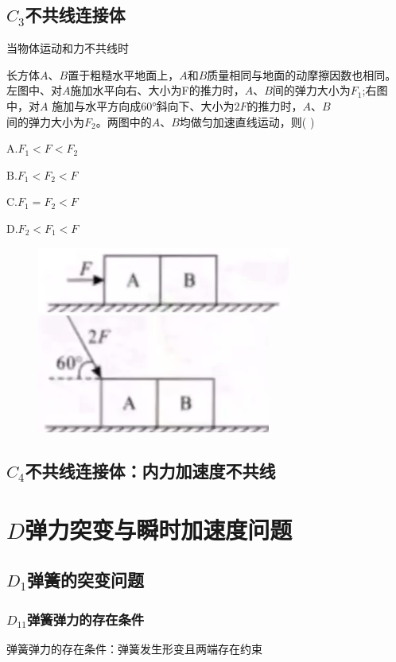 \documentclass[lang=cn,10pt]{elegantbook}
\begin{document}
       \subsection{$C_{3}$不共线连接体}
       当物体运动和力不共线时
       \vspace{3cm}
       \begin{example}
       	长方体$A$、$B$置于粗糙水平地面上，$A$和$B$质量相同与地面的动摩擦因数也相同。左图中、对$A$施加水平向右、大小为F的推力时，$A、B$间的弹力大小为$F_1$;右图中，对$A$ 施加与水平方向成60°斜向下、大小为$2F$的推力时，$A$、$B$ $\text{间的弹力大小为}F_2$。两图中的$A$、$B$均做匀加速直线运动，则( ) 
       	
       	$\mathrm{A.}F_{1}<F<F_{2}$
       	
       	$\mathrm{B.}F_{1}<F_{2}<F$
       	
       $	\mathrm{C.}F_{1}=F_{2}<F$
       	
       	$\mathrm{D.}F_{2}<F_{1}<F$
       	\begin{figure}[H]
       		\centering
       		\includegraphics[width=0.3\linewidth]{image/42}
       		\includegraphics[width=0.3\linewidth]{image/43}
       	\end{figure}
       	
       \end{example}
       \subsection{$C_{4}$不共线连接体：内力加速度不共线}
       \vspace{3cm}
       \section{$D$弹力突变与瞬时加速度问题}
       \subsection{$D_{1}$弹簧的突变问题}
       \subsubsection{$D_{11}$弹簧弹力的存在条件}
       弹簧弹力的存在条件：弹簧发生形变且两端存在约束
       
\end{document}
